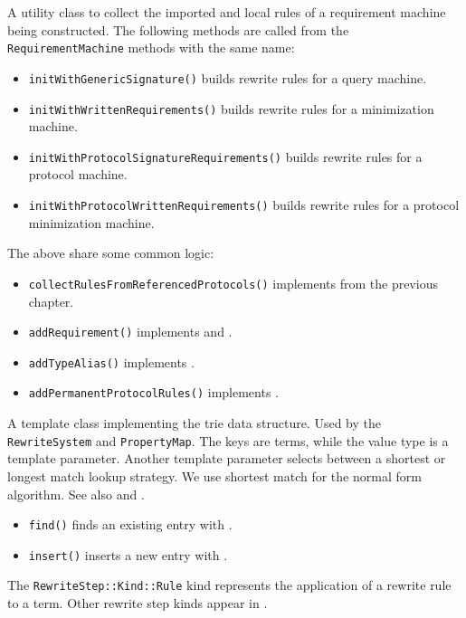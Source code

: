 \documentclass[../generics]{subfiles}
\begin{document}
A utility class to collect the imported and local rules of a requirement machine being constructed. The following methods are called from the \texttt{RequirementMachine} methods with the same name:
\begin{itemize}
\item \texttt{initWithGenericSignature()} builds rewrite rules for a query machine.
\item \texttt{initWithWrittenRequirements()} builds rewrite rules for a minimization machine.
\item \texttt{initWithProtocolSignatureRequirements()} builds rewrite rules for a protocol machine.
\item \texttt{initWithProtocolWrittenRequirements()} builds rewrite rules for a protocol minimization machine.
\end{itemize}
The above share some common logic:
\begin{itemize}
\item \texttt{collectRulesFromReferencedProtocols()} implements  from the previous chapter.
\item \texttt{addRequirement()} implements  and .
\item \texttt{addTypeAlias()} implements .
\item \texttt{addPermanentProtocolRules()} implements .
\end{itemize}

A template class implementing the trie data structure. Used by the \texttt{RewriteSystem} and \texttt{PropertyMap}. The keys are terms, while the value type is a template parameter. Another template parameter selects between a shortest or longest match lookup strategy. We use shortest match for the normal form algorithm. See also  and .
\begin{itemize}
\item \texttt{find()} finds an existing entry with .
\item \texttt{insert()} inserts a new entry with .
\end{itemize}

The \texttt{RewriteStep::Kind::Rule} kind represents the application of a rewrite rule to a term. Other rewrite step kinds appear in .
\end{document}
